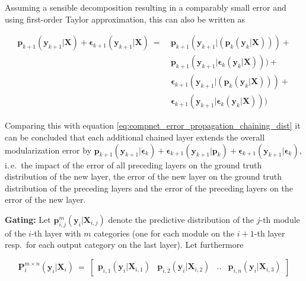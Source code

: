 Assuming a sensible decomposition resulting in a comparably small error and using first-order Taylor approximation, this can also be written as

\begin{equation}
\label{eq:compnet_error_propagation_chaining_dist_additional_layer_taylor}
\begin{split}
    \textbf{p}_{k+1}(\textbf{y}_{k+1}|\textbf{X})+\boldsymbol{\epsilon}_{k+1}(\textbf{y}_{k+1}|\textbf{X})\ =\ &
    \textbf{p}_{k+1}(\textbf{y}_{k+1}|(\textbf{p}_k(\textbf{y}_k|\textbf{X})))+\\
    & \textbf{p}_{k+1}(\textbf{y}_{k+1}|\boldsymbol{\epsilon}_k(\textbf{y}_k|\textbf{X})))+\\
    & \boldsymbol{\epsilon}_{k+1}(\textbf{y}_{k+1}|(\textbf{p}_k(\textbf{y}_k|\textbf{X})))+\\
    & \boldsymbol{\epsilon}_{k+1}(\textbf{y}_{k+1}|\boldsymbol{\epsilon}_k(\textbf{y}_k|\textbf{X})))
    \end{split}
\end{equation}

Comparing this with equation \ref{eq:compnet_error_propagation_chaining_dist} it can be concluded that each additional chained layer extends the overall modularization error by $\textbf{p}_{k+1}(\textbf{y}_{k+1}|\boldsymbol{\epsilon}_k)+  \boldsymbol{\epsilon}_{k+1}(\textbf{y}_{k+1}|\textbf{p}_k)+\boldsymbol{\epsilon}_{k+1}(\textbf{y}_{k+1}|\boldsymbol{\epsilon}_k)$, i.\,e.\ the impact of the error of all preceding layers on the ground truth distribution of the new layer, the error of the new layer on the ground truth distribution of the preceding layers and the error of the preceding layers on the error of the new layer.

\pagebreak

\textbf{Gating:} Let $\textbf{p}_{i,j}^m(\textbf{y}_i|\textbf{X}_{i,j})$ denote the predictive distribution of the $j$-th module of the $i$-th layer with $m$ categories (one for each module on the $i+1$-th layer resp.\ for each output category on the last layer). Let furthermore

\begin{equation}
\label{eq:compnet_error_propagation_gating_dist_layer_i}
    \textbf{P}_i^{m{\times}n}(\textbf{y}_i|\textbf{X}_i)\ =\ %
    \begin{bmatrix}
        \textbf{p}_{i,1}(\textbf{y}_i|\textbf{X}_{i,1}) & \textbf{p}_{i,2}(\textbf{y}_i|\textbf{X}_{i,2}) & .. & \textbf{p}_{i,n}(\textbf{y}_i|\textbf{X}_{i,3})
    \end{bmatrix}
\end{equation}

